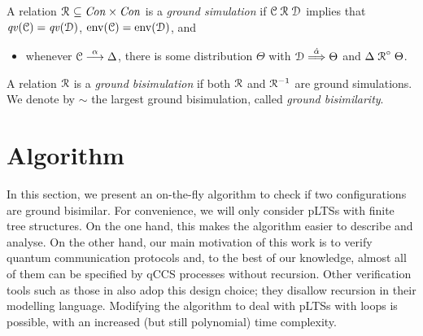 \documentclass[a4paper,UKenglish,cleveref, autoref]{lipics-v2019}
\newcommand{\ptr}{{\rm env}}
\newcommand{\lift}[1]{\mathrel{{#1}^\circ}}
\newcommand{\Con}{{\it Con}}
\newcommand{\qv}{{\it qv}}
\newcommand{\CC}{{\cal C}}
\newcommand{\CD}{{\cal D}}
\begin{document}
\begin{definition}[\cite{DF12}]
	A relation $\aRel\ \subseteq \Con\times\Con$ is a \emph{ground simulation} if
	$\CC\aRel \CD$ implies that $\qv(\CC)=\qv(\CD)$, $\ptr(\CC)=\ptr(\CD)$,
	and
	\begin{itemize}
		\item whenever $\CC\ar{\alpha} \Delta$, there is some distribution $\Theta$ with $\CD\dar{\hat{\alpha}}\Theta$ and $\Delta \lift{\aRel} \Theta$.
	\end{itemize}
	A relation $\mathrel{{\mathcal R }}$ is a \emph{ground bisimulation} if both $\mathrel{{\mathcal R }}$ and
	$\mathrel{{\mathcal R }}^{-1}$ are ground simulations. %
	We denote by $\sim$ the largest ground bisimulation, called \emph{ground bisimilarity}.
\end{definition}

\section{Algorithm}
\label{sec:algorithm}
In this section, we present an on-the-fly algorithm to check if two configurations are ground bisimilar.
For convenience, we will only consider pLTSs with finite tree structures. On the one hand, this makes the algorithm easier to describe and analyse. On the other hand, our main motivation of this work is to verify quantum communication protocols and, to the best of our knowledge, almost all of them can be specified by qCCS processes without recursion. 
Other verification tools such as those in \cite{KKKKS16,AL18} also adop this design choice; they disallow recursion in their modelling language.
Modifying the algorithm to deal with pLTSs with loops is possible, with an increased (but still polynomial) time complexity.
\end{document}

